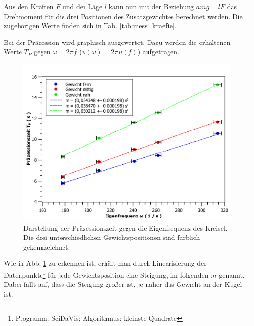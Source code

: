 	Aus den Kräften $F$ und der Läge $l$ kann nun mit der Beziehung $amg = lF$ das Drehmoment für die drei Positionen des Zusatzgewichtes berechnet werden.
	Die zugehörigen Werte finden sich in Tab. \ref{tab:mess_kraefte}.
	
	Bei der Präzession wird graphisch ausgewertet.
	Dazu werden die erhaltenen Werte $T_P$ gegen $\omega = 2\pi f$ ($u(\omega) = 2\pi u(f)$) aufgetragen.
	\begin{figure}[ht]
		\centering
		\includegraphics[width=\textwidth]{kreisel_wT_multi.pdf}
		\caption{Darstellung der Präzessionszeit gegen die Eigenfrequenz des Kreisel. Die drei unterschiedlichen Gewichtspositionen sind farblich gekennzeichnet.}
		\label{abb:Tw-multi}	
	\end{figure}
	Wie in Abb. \ref{abb:Tw-multi} zu erkennen ist, erhält man durch Linearisierung der Datenpunkte\footnote{Programm: SciDaVis; Algorithmus: kleinste Quadrate} für jede Gewichtsposition eine Steigung, im folgenden $m$ genannt.
	Dabei fällt auf, dass die Steigung größer ist, je näher das Gewicht an der Kugel ist.
	
